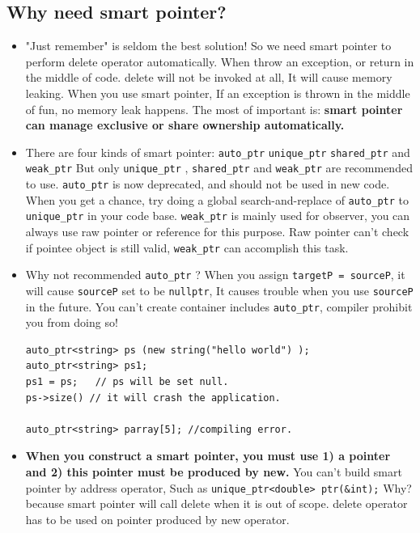 \documentclass[a4paper,11pt,twoside]{book}
\begin{document}
\subsection{Why need smart pointer?}
\begin{itemize}
	
	\item "Just remember" is seldom the best solution! So we need smart pointer to perform delete operator automatically. When throw an exception, or return in the middle of code. delete will not be invoked at all, It will cause memory leaking. When you use smart pointer, If an exception is thrown in the middle of fun, no memory leak happens. The most of important is: \textbf{smart pointer can manage exclusive or share ownership automatically. }



	\item There are four kinds of smart pointer: \texttt{auto\_ptr} \texttt{unique\_ptr} \texttt{shared\_ptr} and \texttt{weak\_ptr}  But only \texttt{unique\_ptr} , \texttt{shared\_ptr} and \texttt{weak\_ptr} are recommended to use. \texttt{auto\_ptr} is now deprecated, and should not be used in new code. When you get a chance, try doing a global search-and-replace of \texttt{auto\_ptr} to \texttt{unique\_ptr} in your code base.  \texttt{weak\_ptr} is mainly used for observer, you can always use raw pointer or reference for this purpose. Raw pointer can't check if pointee object is still valid, \texttt{weak\_ptr} can accomplish this task.


\item Why not recommended \texttt{auto\_ptr} ? When you assign \texttt{targetP = sourceP}, it will cause \texttt{sourceP} set to be \texttt{nullptr}, It causes trouble when you use \texttt{sourceP} in the future. You can't create container includes \texttt{auto\_ptr}, compiler prohibit you from doing so!

\begin{lstlisting}[numbers=none]
auto_ptr<string> ps (new string("hello world") );
auto_ptr<string> ps1;
ps1 = ps;   // ps will be set null.
ps->size() // it will crash the application.

auto_ptr<string> parray[5]; //compiling error.
\end{lstlisting}

\item \textbf{When you construct a smart pointer, you must use 1) a pointer and 2) this pointer must be produced by new.} You can't build smart pointer by address operator, Such as \texttt{unique\_ptr<double> ptr(\&int);}   Why? because smart pointer will call delete when it is out of scope.  delete operator has to be used on pointer produced by new operator.


\end{itemize}
\end{document}
